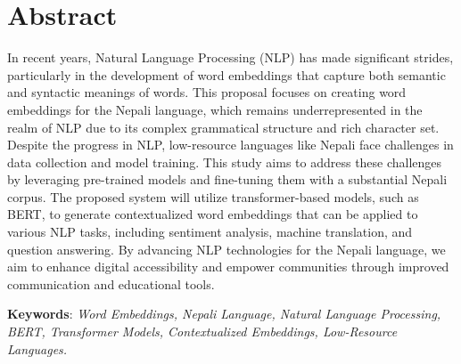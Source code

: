 		
		
		\large
			\chapter*{Abstract}
		\normalsize
        \noindent
		In recent years, Natural Language Processing (NLP) has made significant strides, particularly in the development of word embeddings that capture both semantic and syntactic meanings of words. This proposal focuses on creating word embeddings for the Nepali language, which remains underrepresented in the realm of NLP due to its complex grammatical structure and rich character set. Despite the progress in NLP, low-resource languages like Nepali face challenges in data collection and model training. This study aims to address these challenges by leveraging pre-trained models and fine-tuning them with a substantial Nepali corpus. The proposed system will utilize transformer-based models, such as BERT, to generate contextualized word embeddings that can be applied to various NLP tasks, including sentiment analysis, machine translation, and question answering. By advancing NLP technologies for the Nepali language, we aim to enhance digital accessibility and empower communities through improved communication and educational tools.

		\noindent
		\textbf{Keywords}: 
		\textit{Word Embeddings, Nepali Language, Natural Language Processing, BERT, Transformer Models, Contextualized Embeddings, Low-Resource Languages.\\
 }\\

		\break


	    \tableofcontents

		\break
		\pagebreak

		\listoffigures
		\break
	
	
	
		\Large
			\begingroup
				\let\clearpage\relax
